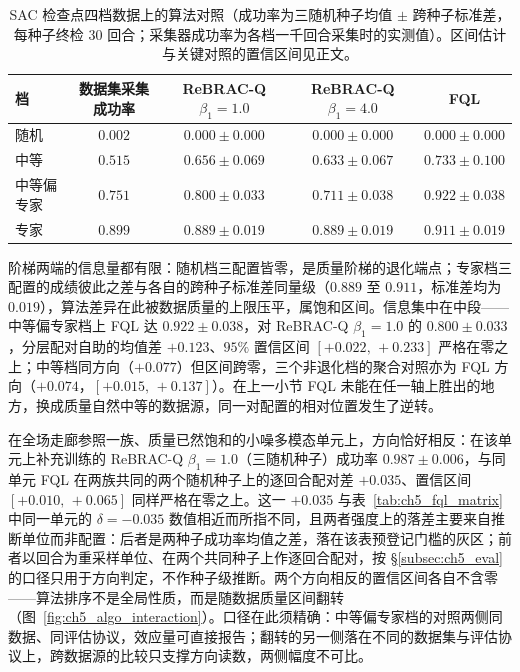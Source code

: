 \begin{table}[t]
\centering
\caption{SAC 检查点四档数据上的算法对照（成功率为三随机种子均值 $\pm$ 跨种子标准差，每种子终检 $30$ 回合；采集器成功率为各档一千回合采集时的实测值）。区间估计与关键对照的置信区间见正文。}
\label{tab:ch5_algo_sac}
\small
\setlength{\tabcolsep}{5pt}
\begin{tabular}{l c c c c}
\toprule
\textbf{档} & \textbf{数据集采集成功率} & \textbf{ReBRAC-Q $\beta_1{=}1.0$} & \textbf{ReBRAC-Q $\beta_1{=}4.0$} & \textbf{FQL} \\
\midrule
随机 & $0.002$ & $0.000 \pm 0.000$ & $0.000 \pm 0.000$ & $0.000 \pm 0.000$ \\
中等 & $0.515$ & $0.656 \pm 0.069$ & $0.633 \pm 0.067$ & $0.733 \pm 0.100$ \\
中等偏专家 & $0.751$ & $0.800 \pm 0.033$ & $0.711 \pm 0.038$ & $\mathbf{0.922 \pm 0.038}$ \\
专家 & $0.899$ & $0.889 \pm 0.019$ & $0.889 \pm 0.019$ & $0.911 \pm 0.019$ \\
\bottomrule
\end{tabular}
\end{table}

阶梯两端的信息量都有限：随机档三配置皆零，是质量阶梯的退化端点；专家档三配置的成绩彼此之差与各自的跨种子标准差同量级（$0.889$ 至 $0.911$，标准差均为 $0.019$），算法差异在此被数据质量的上限压平，属饱和区间。信息集中在中段——中等偏专家档上 FQL 达 $0.922\pm0.038$，对 ReBRAC-Q $\beta_1=1.0$ 的 $0.800\pm0.033$，分层配对自助的均值差 $+0.123$、$95\%$ 置信区间 $[+0.022,\,+0.233]$ 严格在零之上；中等档同方向（$+0.077$）但区间跨零，三个非退化档的聚合对照亦为 FQL 方向（$+0.074$，$[+0.015,\,+0.137]$）。在上一小节 FQL 未能在任一轴上胜出的地方，换成质量自然中等的数据源，同一对配置的相对位置发生了逆转。

在全场走廊参照一族、质量已然饱和的小噪多模态单元上，方向恰好相反：在该单元上补充训练的 ReBRAC-Q $\beta_1=1.0$（三随机种子）成功率 $0.987\pm0.006$，与同单元 FQL 在两族共同的两个随机种子上的逐回合配对差 $+0.035$、置信区间 $[+0.010,\,+0.065]$ 同样严格在零之上。这一 $+0.035$ 与表~\ref{tab:ch5_fql_matrix} 中同一单元的 $\delta=-0.035$ 数值相近而所指不同，且两者强度上的落差主要来自推断单位而非配置：后者是两种子成功率均值之差，落在该表预登记门槛的灰区；前者以回合为重采样单位、在两个共同种子上作逐回合配对，按 \S\ref{subsec:ch5_eval} 的口径只用于方向判定，不作种子级推断。两个方向相反的置信区间各自不含零——算法排序不是全局性质，而是随数据质量区间翻转（图~\ref{fig:ch5_algo_interaction}）。口径在此须精确：中等偏专家档的对照两侧同数据、同评估协议，效应量可直接报告；翻转的另一侧落在不同的数据集与评估协议上，跨数据源的比较只支撑方向读数，两侧幅度不可比。

